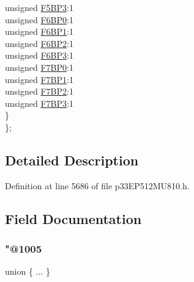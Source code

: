 \begin{DoxyCompactItemize}
\begin{tabbing}
\>\>unsigned \hyperlink{structtag_c2_b_u_f_p_n_t2_b_i_t_s_acfb3fca097b38fb9e51082d6e3865248}{F5BP3}:1\\
\>\>unsigned \hyperlink{structtag_c2_b_u_f_p_n_t2_b_i_t_s_aec8e4fb99afcab3a5656cf959efb6364}{F6BP0}:1\\
\>\>unsigned \hyperlink{structtag_c2_b_u_f_p_n_t2_b_i_t_s_a34aae39036218f34dc4a663e951478b0}{F6BP1}:1\\
\>\>unsigned \hyperlink{structtag_c2_b_u_f_p_n_t2_b_i_t_s_ac4317c346de93de2215fb30889ccbdf1}{F6BP2}:1\\
\>\>unsigned \hyperlink{structtag_c2_b_u_f_p_n_t2_b_i_t_s_af6530b53f38940ff3be1b259acb5bf30}{F6BP3}:1\\
\>\>unsigned \hyperlink{structtag_c2_b_u_f_p_n_t2_b_i_t_s_a9d85c4e73be55e0e406f1c245fba554c}{F7BP0}:1\\
\>\>unsigned \hyperlink{structtag_c2_b_u_f_p_n_t2_b_i_t_s_a783c11bf9aac73fbf977be6ebd21dcd5}{F7BP1}:1\\
\>\>unsigned \hyperlink{structtag_c2_b_u_f_p_n_t2_b_i_t_s_ad17ad8a4e0bdc19525382cdbd924ad5c}{F7BP2}:1\\
\>\>unsigned \hyperlink{structtag_c2_b_u_f_p_n_t2_b_i_t_s_aad9539f9fb073db359d4b0c4ec752456}{F7BP3}:1\\
\>\} \\
\}; \\

\end{tabbing}\end{DoxyCompactItemize}


\subsection{Detailed Description}


Definition at line 5686 of file p33\+E\+P512\+M\+U810.\+h.



\subsection{Field Documentation}
\mbox{\label{structtag_c2_b_u_f_p_n_t2_b_i_t_s_a950743fde2fc466dfac93ca404a4ea3c}} 
\subsubsection{\texorpdfstring{"@1005}{@1005}}
{\footnotesize\ttfamily union \{ ... \} }

